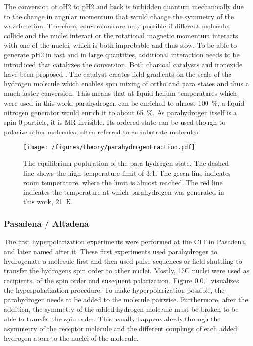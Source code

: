             The conversion of oH2 to pH2 and back is forbidden quantum mechanically due to the change in angular momentum that would change the symmetry of the wavefunction. Therefore, conversions are only possible if different molecules collide and the nuclei interact or the rotational magnetic momentum interacts with one of the nuclei, which is both improbable and thus slow. To be able to generate pH2 in fast and in large quantities, additional interaction needs to be introduced that catalyzes the conversion. Both charcoal catalysts and ironoxide have been proposed \cite{}. The catalyst creates field gradients on the scale of the hydrogen molecule which enables spin mixing of ortho and para states\cite{spinCatalysisOfOrthoParaHydrogenConversion} and thus a much faster conversion. This means that at liquid helium temperatures which were used in this work, parahydrogen can be enriched to almost \SI{100}{\%}, a liquid nitrogen generator would enrich it to about \SI{65}{\%}.
            As parahydrogen itself is a spin 0 particle, it is MR-invisible. Its ordered state can be used though to polarize other molecules, often referred to as substrate molecules.
            \begin{figure}
                \texttt{[image: /figures/theory/parahydrogenFraction.pdf]}
                \caption[Parahydrogen fraction]{The equilibrium poplulation of the para hydrogen state. The dashed line shows the high temperature limit of 3:1. The green line indicates room temperature, where the limit is almost reached. The red line indicates the temperature at which parahydrogen was generated in this work, \SI{21}{\kelvin}.}
                \label{figure:theory:ph2Fraction}
            \end{figure}
        \subsubsection{Pasadena / Altadena}
        The first hyperpolarization experiments were performed at the CIT in Pasadena, and later named after it. These first experiments used parahydrogen to hydrogenate a molecule first and then used pulse sequences or field shuttling to transfer the hydrogens spin order to other nuclei. Mostly, 13C nuclei were used as recipients. of the spin order and susequent polarization. Figure \ref{} visualizes the hyperpolarization procedure. To make hyperpolarization possible, the parahydrogen needs to be added to the molecule pairwise. Furthermore, after the addition, the symmetry of the added hydrogen molecule must be broken to be able to transfer the spin order. This usually happens alredy through the asymmetry of the receptor molecule and the different couplings of each added hydrogen atom to the nuclei of the molecule.
